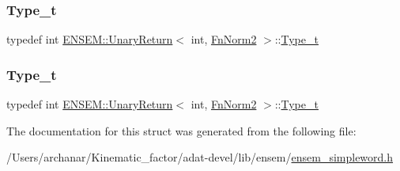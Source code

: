 \mbox{\label{structENSEM_1_1UnaryReturn_3_01int_00_01FnNorm2_01_4_ae4204ae93a1e761995e0aaab5504ea66}} 
\subsubsection{\texorpdfstring{Type\_t}{Type\_t}\hspace{0.1cm}{\footnotesize\ttfamily [2/3]}}
{\footnotesize\ttfamily typedef int \mbox{\hyperlink{structENSEM_1_1UnaryReturn}{E\+N\+S\+E\+M\+::\+Unary\+Return}}$<$ int, \mbox{\hyperlink{structENSEM_1_1FnNorm2}{Fn\+Norm2}} $>$\+::\mbox{\hyperlink{structENSEM_1_1UnaryReturn_3_01int_00_01FnNorm2_01_4_ae4204ae93a1e761995e0aaab5504ea66}{Type\+\_\+t}}}

\mbox{\label{structENSEM_1_1UnaryReturn_3_01int_00_01FnNorm2_01_4_ae4204ae93a1e761995e0aaab5504ea66}} 
\subsubsection{\texorpdfstring{Type\_t}{Type\_t}\hspace{0.1cm}{\footnotesize\ttfamily [3/3]}}
{\footnotesize\ttfamily typedef int \mbox{\hyperlink{structENSEM_1_1UnaryReturn}{E\+N\+S\+E\+M\+::\+Unary\+Return}}$<$ int, \mbox{\hyperlink{structENSEM_1_1FnNorm2}{Fn\+Norm2}} $>$\+::\mbox{\hyperlink{structENSEM_1_1UnaryReturn_3_01int_00_01FnNorm2_01_4_ae4204ae93a1e761995e0aaab5504ea66}{Type\+\_\+t}}}



The documentation for this struct was generated from the following file\+:\begin{DoxyCompactItemize}
\item 
/\+Users/archanar/\+Kinematic\+\_\+factor/adat-\/devel/lib/ensem/\mbox{\hyperlink{adat-devel_2lib_2ensem_2ensem__simpleword_8h}{ensem\+\_\+simpleword.\+h}}\end{DoxyCompactItemize}

